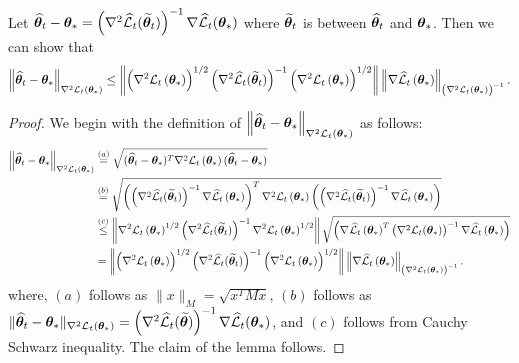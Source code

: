 \begin{lemma}
\label{lemma:inequality}
Let ${\widehat{\bm{\theta}}}_t - \bm{\theta}_* = \left(\nabla^2 \widehat{\cal L}_t(\widetilde{\bm{\theta}}_t)\right)^{-1}\nabla \widehat{\cal L}_t(\bm{\theta}_*)$ where $\widetilde{\bm{\theta}}_t$ is between ${\widehat{\bm{\theta}}}_{t}$ and $\bm{\theta}_{*}$. Then we can show that
\begin{align*}
    \left\|{\widehat{\bm{\theta}}}_{t}-\bm{\theta}_{*}\right\|_{\nabla^{2} {\cal L}_{t}\left(\bm{\theta}_{*}\right)} \leq \left\|\left(\nabla^{2} {\cal L}_{t}\left(\bm{\theta}_{*}\right)\right)^{1 / 2}\left(\nabla^{2} \widehat{\cal L}_{t}(\widetilde{\bm{\theta}}_{t})\right)^{-1}\left(\nabla^{2} {\cal L}_{t}\left(\bm{\theta}_{*}\right)\right)^{1 / 2}\right\|\left\|\nabla \widehat{\cal L}_{t}\left(\bm{\theta}_{*}\right)\right\|_{\left(\nabla^{2} {\cal L}_{t}\left(\bm{\theta}_{*}\right)\right)^{-1}} .
\end{align*}
\end{lemma}

\begin{proof}
We begin with the definition of $\left\|{\widehat{\bm{\theta}}}_{t}-\bm{\theta}_{*}\right\|_{\nabla^{2} {\cal L}_{t}\left(\bm{\theta}_{*}\right)}$ as follows:
\begin{align*}
\left\|{\widehat{\bm{\theta}}}_{t}-\bm{\theta}_{*}\right\|_{\nabla^{2} {\cal L}_{t}\left(\bm{\theta}_{*}\right)} &\overset{(a)}{=} \sqrt{({\widehat{\bm{\theta}}}_{t}-\bm{\theta}_{*})^T\nabla^{2} {\cal L}_{t}\left(\bm{\theta}_{*}\right)({\widehat{\bm{\theta}}}_{t}-\bm{\theta}_{*})}\\
&\overset{(b)}{=} \sqrt{\left(\left(\nabla^{2} \widehat{\cal L}_{t}(\widetilde{\bm{\theta}}_{t})\right)^{-1} \nabla \widehat{\cal L}_{t}\left(\bm{\theta}_{*}\right)\right)^T\nabla^{2} {\cal L}_{t}\left(\bm{\theta}_{*}\right)\left(\left(\nabla^{2} \widehat{\cal L}_{t}(\widetilde{\bm{\theta}}_{t})\right)^{-1} \nabla \widehat{\cal L}_{t}\left(\bm{\theta}_{*}\right)\right)}\\
&\overset{(c)}{\leq}  \left\|\nabla^2 {\cal L}_{t}\left(\bm{\theta}_{*}\right)^{1/2} \left(\nabla^{2} \widehat{\cal L}_{t}(\widetilde{\bm{\theta}}_{t})\right)^{-1}\nabla^2 {\cal L}_{t}\left(\bm{\theta}_{*}\right)^{1/2}\right\| \sqrt{\left(\nabla^{} \widehat{\cal L}_{t}\left(\bm{\theta}_{*}\right)^T\left(\nabla^{2} {\cal L}_{t}(\bm{\theta}_*)\right)^{-1} \nabla \widehat{\cal L}_{t}\left(\bm{\theta}_{*}\right)\right)}\\
& = \left\|\left(\nabla^{2} {\cal L}_{t}\left(\bm{\theta}_{*}\right)\right)^{1 / 2}\left(\nabla^{2} \widehat{\cal L}_{t}(\widetilde{\bm{\theta}}_{t})\right)^{-1}\left(\nabla^{2} {\cal L}_{t}\left(\bm{\theta}_{*}\right)\right)^{1 / 2}\right\|\left\|\nabla \widehat{\cal L}_{t}\left(\bm{\theta}_{*}\right)\right\|_{\left(\nabla^{2} {\cal L}_{t}\left(\bm{\theta}_{*}\right)\right)^{-1}} .
\end{align*}
where, $(a)$ follows as $\|x\|_{M} = \sqrt{x^T M x}$, $(b)$ follows as $\|{\widehat{\bm{\theta}}}_t - \bm{\theta}_*\|_{\nabla^2 {\cal L}_t(\bm{\theta}_*)} = \left(\nabla^2 \widehat{\cal L}_t(\widetilde{\bm{\theta}})\right)^{-1}\nabla \widehat{\cal L}_t(\bm{\theta}_*)$, and $(c)$ follows from Cauchy Schwarz inequality.
%
The claim of the lemma follows.
\end{proof}

